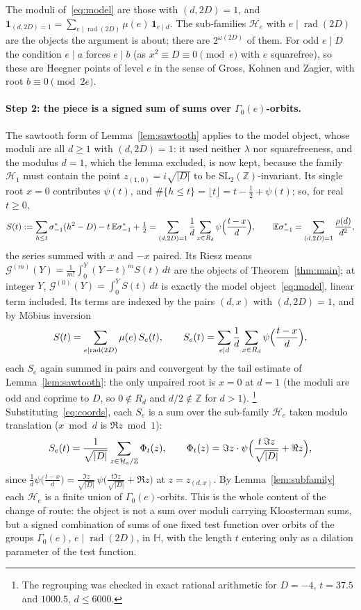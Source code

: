 \documentclass[11pt,a4paper]{article}
\theoremstyle{remark}\newtheorem{remark}[theorem]{Remark}
\newcommand{\Z}{\mathbb Z}\newcommand{\R}{\mathbb R}\newcommand{\Q}{\mathbb Q}\newcommand{\C}{\mathbb C}
\begin{document}
The moduli of~\eqref{eq:model} are those with $(d,2D)=1$, and
$\mathbf 1_{(d,2D)=1}=\sum_{e\mid\operatorname{rad}(2D)}\mu(e)\,\mathbf 1_{e\mid d}$. The sub-families $\mathcal H_e$ with
$e\mid\operatorname{rad}(2D)$ are the objects the argument is about; there are $2^{\omega(2D)}$ of them. For odd
$e\mid D$ the condition $e\mid a$ forces $e\mid b$ (as $x^2\equiv D\equiv0\pmod e$ with $e$ squarefree), so these are
Heegner points of level $e$ in the sense of Gross, Kohnen and Zagier, with root $b\equiv0\pmod{2e}$.

\paragraph{Step 2: the piece is a signed sum of sums over $\Gamma_0(e)$-orbits.} The sawtooth form of
Lemma~\ref{lem:sawtooth} applies to the model object, whose moduli are all $d\ge1$ with $(d,2D)=1$: it used neither
$\lambda$ nor squarefreeness, and the modulus $d=1$, which the lemma excluded, is now kept, because the family
$\mathcal H_1$ must contain the point $z_{(1,0)}=i\sqrt{|D|}$ to be $\mathrm{SL}_2(\Z)$-invariant. Its single root
$x=0$ contributes $\psi(t)$, and $\#\{h\le t\}=\lfloor t\rfloor=t-\tfrac12+\psi(t)$; so, for real $t\ge0$,
\[
S(t):=\sum_{h\le t}\sigma^*_{-1}(h^2-D)-t\,\mathbb E\sigma^*_{-1}+\tfrac12=\sum_{(d,2D)=1}\frac1d\sum_{x\in R_d}\psi\Bigl(\frac{t-x}d\Bigr),
\qquad \mathbb E\sigma^*_{-1}=\sum_{(d,2D)=1}\frac{\rho(d)}{d^2},
\]
the series summed with $x$ and $-x$ paired. Its Riesz means $\mathcal G^{(m)}(Y)=\frac1{m!}\int_0^Y(Y-t)^mS(t)\,dt$
are the objects of Theorem~\ref{thm:main}; at integer $Y$, $\mathcal G^{(0)}(Y)=\int_0^YS(t)\,dt$ is exactly the
model object~\eqref{eq:model}, linear term included. Its terms are indexed by the pairs $(d,x)$ with $(d,2D)=1$, and by
M\"obius inversion
\[
S(t)=\sum_{e\mid\operatorname{rad}(2D)}\mu(e)\,S_e(t),\qquad S_e(t)=\sum_{e\mid d}\frac1d\sum_{x\in R_d}\psi\Bigl(\frac{t-x}d\Bigr),
\]
each $S_e$ again summed in pairs and convergent by the tail estimate of Lemma~\ref{lem:sawtooth}: the only unpaired
root is $x=0$ at $d=1$ (the moduli are odd and coprime to $D$, so $0\notin R_d$ and $d/2\notin\Z$ for $d>1$). \footnote{The regrouping was checked in exact rational arithmetic
for $D=-4$, $t=37.5$ and $1000.5$, $d\le6000$.} Substituting~\eqref{eq:coords}, each $S_e$ is a sum over the
sub-family $\mathcal H_e$ taken modulo translation ($x\bmod d$ is $\Re z\bmod1$):
\begin{equation}\label{eq:orbit}
S_e(t)=\frac{1}{\sqrt{|D|}}\sum_{z\in\mathcal H_e/\Z}\Phi_t(z),\qquad
\Phi_t(z)=\Im z\cdot\psi\Bigl(\frac{t\,\Im z}{\sqrt{|D|}}+\Re z\Bigr),
\end{equation}
since $\frac1d\psi\bigl(\frac{t-x}d\bigr)=\frac{\Im z}{\sqrt{|D|}}\,\psi\bigl(\frac{t\Im z}{\sqrt{|D|}}+\Re z\bigr)$ at
$z=z_{(d,x)}$. By Lemma~\ref{lem:subfamily} each $\mathcal H_e$ is a finite union of $\Gamma_0(e)$-orbits. This is the
whole content of the change of route: the object is not a sum over moduli carrying Kloosterman sums, but a signed
combination of sums of one fixed test function over orbits of the groups $\Gamma_0(e)$, $e\mid\operatorname{rad}(2D)$,
in $\mathbb H$, with the length $t$ entering only as a dilation parameter of the test function.
\end{document}
